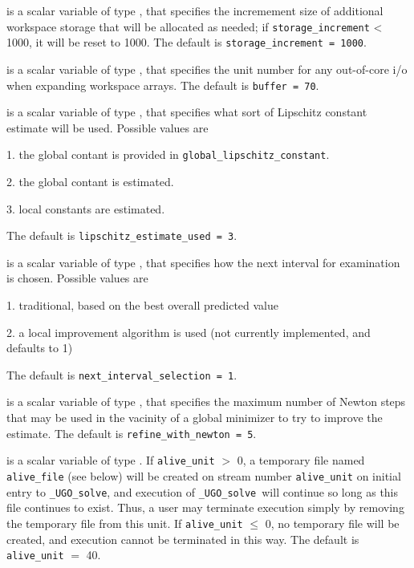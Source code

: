 \documentclass{galahad}
\newcommand{\packagename}{UGO}
\newcommand{\fullpackagename}{\libraryname\_\packagename}
\newcommand{\solver}{{\tt \fullpackagename\_solve}}
\begin{document}
\begin{description}
 is a scalar variable of type \integer, that
specifies the incremement size of additional workspace storage that will be
allocated as needed; if {\tt storage\_increment} < 1000, it will be reset
to 1000.
The default is {\tt storage\_increment = 1000}.

 is a scalar variable of type \integer, that specifies
the unit number for any out-of-core i/o when expanding workspace arrays.
The default is {\tt buffer = 70}.

 is a scalar variable of type \integer,
that specifies what sort of Lipschitz constant estimate will be used.
Possible values are
\begin{description}
\item 1. the  global contant is provided in {\tt global\_lipschitz\_constant}.
\item 2. the global contant is estimated.
\item 3. local constants are estimated.
\end{description}
The default is {\tt lipschitz\_estimate\_used = 3}.

 is a scalar variable of type \integer,
that specifies how the next interval for examination is chosen. Possible
values are
\begin{description}
\item 1. traditional, based on the best overall predicted value
\item 2. a local improvement algorithm is used (not currently implemented,
  and defaults to 1)
\end{description}
The default is {\tt next\_interval\_selection = 1}.

 is a scalar variable of type \integer, that
specifies the maximum number of Newton steps that may be used in the
vacinity of a global  minimizer to try to improve the estimate.
The default is {\tt refine\_with\_newton = 5}.

 is a scalar variable of type \integer.
If {\tt alive\_unit} $>$ 0, a temporary file named {\tt alive\_file} (see below)
will be created on stream number {\tt alive\_unit} on initial entry to
\solver, and execution of \solver\ will continue so
long as this file continues to exist. Thus, a user may terminate execution
simply by removing the temporary file from this unit.
If {\tt alive\_unit} $\leq$ 0, no temporary file will be created, and
execution cannot be terminated in this way.
The default is {\tt alive\_unit} $=$ 40.


\end{description}
\end{document}
